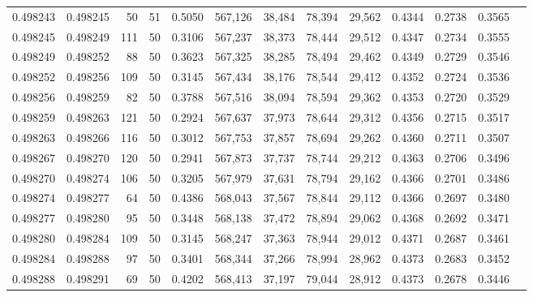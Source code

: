 \begin{tabular}{rrrrrrrrrrrrr}
0.498243 & 0.498245 &    50 &  51 &                                     0.5050 & 567,126 &  38,484 &  78,394 &  29,562 & 0.4344 & 0.2738 & 0.3565 \\
0.498245 & 0.498249 &   111 &  50 &                                     0.3106 & 567,237 &  38,373 &  78,444 &  29,512 & 0.4347 & 0.2734 & 0.3555 \\
0.498249 & 0.498252 &    88 &  50 &                                     0.3623 & 567,325 &  38,285 &  78,494 &  29,462 & 0.4349 & 0.2729 & 0.3546 \\
0.498252 & 0.498256 &   109 &  50 &                                     0.3145 & 567,434 &  38,176 &  78,544 &  29,412 & 0.4352 & 0.2724 & 0.3536 \\
0.498256 & 0.498259 &    82 &  50 &                                     0.3788 & 567,516 &  38,094 &  78,594 &  29,362 & 0.4353 & 0.2720 & 0.3529 \\
0.498259 & 0.498263 &   121 &  50 &                                     0.2924 & 567,637 &  37,973 &  78,644 &  29,312 & 0.4356 & 0.2715 & 0.3517 \\
0.498263 & 0.498266 &   116 &  50 &                                     0.3012 & 567,753 &  37,857 &  78,694 &  29,262 & 0.4360 & 0.2711 & 0.3507 \\
0.498267 & 0.498270 &   120 &  50 &                                     0.2941 & 567,873 &  37,737 &  78,744 &  29,212 & 0.4363 & 0.2706 & 0.3496 \\
0.498270 & 0.498274 &   106 &  50 &                                     0.3205 & 567,979 &  37,631 &  78,794 &  29,162 & 0.4366 & 0.2701 & 0.3486 \\
0.498274 & 0.498277 &    64 &  50 &                                     0.4386 & 568,043 &  37,567 &  78,844 &  29,112 & 0.4366 & 0.2697 & 0.3480 \\
0.498277 & 0.498280 &    95 &  50 &                                     0.3448 & 568,138 &  37,472 &  78,894 &  29,062 & 0.4368 & 0.2692 & 0.3471 \\
0.498280 & 0.498284 &   109 &  50 &                                     0.3145 & 568,247 &  37,363 &  78,944 &  29,012 & 0.4371 & 0.2687 & 0.3461 \\
0.498284 & 0.498288 &    97 &  50 &                                     0.3401 & 568,344 &  37,266 &  78,994 &  28,962 & 0.4373 & 0.2683 & 0.3452 \\
0.498288 & 0.498291 &    69 &  50 &                                     0.4202 & 568,413 &  37,197 &  79,044 &  28,912 & 0.4373 & 0.2678 & 0.3446 \\

\end{tabular}

